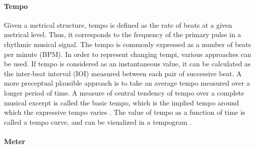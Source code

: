 \documentclass{scrartcl}
\begin{document}
\paragraph{Tempo}
Given a metrical structure, tempo is defined as the rate of beats at a given metrical level. Thus, it corresponds to the frequency of the primary pulse in a rhythmic musical signal. The tempo is commonly expressed as a number of beats per minute (BPM). In order to represent changing tempi, various approaches can be used. If tempo is considered as an instantaneous value, it can be calculated as the inter-beat interval (IOI) measured between each pair of successive beat. A more preceptual plausible approach is to take an average tempo measured over a longer period of time. A measure of central tendency of tempo over a complete musical excerpt is called the basic tempo, which is the implied tempo around which the expressive tempo varies \cite{Repp1994}. The value of tempo as a function of time is called a tempo curve, and can be visualized in a tempogram \cite{Cemgil2001}.


\paragraph{Meter} 
\end{document}
